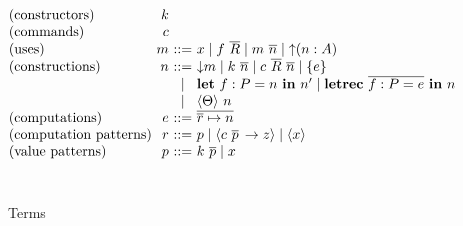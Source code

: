 \documentclass[msc,deptreport,cs]{infthesis} %
\makeatletter
\newcommand{\many}{\overline}
\newcommand\ba{\begin{array}}
\newcommand\ea{\end{array}}
\newenvironment{syntax}{\[\ba{@{}l@{~}r@{~}c@{~}l@{}}}{\ea\]\ignorespacesafterend}
\newcommand{\adapt}{\Theta}
\newcommand{\key}[1]{\mathbf{#1}} %
\newcommand{\handleSymbol}{\rightarrow}
\newcommand{\handle}[2]{{#1} \handleSymbol {#2}}
\newcommand{\thunk}[1]{\{{#1}\}}
\newcommand{\slab}[1]{(\textrm{#1})}
\newcommand{\effin}[1]{\langle {#1} \rangle}
\newcommand{\uc}{\mathord{\downarrow}}
\newcommand{\cu}{\mathord{\uparrow}}
\newcommand{\gor}{\mid}
\makeatother
\begin{document}
\begin{figure} %
\begin{syntax}
  \slab{constructors}               & k \\
  \slab{commands}                   & c \\
  \slab{uses}                 & m      &::= &
     x \gor f~\many{R} \gor m~\many{n} \gor \cu(n:A) \\
  \slab{constructions}        & n      &::= &
    \uc m \gor k~\many{n} \gor c~\many{R}~\many{n} \gor \thunk{e} \\
                              &        &\gor& \key{let}~f : P = n~\key{in}~n'
                                   \gor
                                   \key{letrec}~\many{f : P = e}~\key{in}~n \\
                              &        &\gor&  \effin{\adapt}~n \\
  \slab{computations}         & e      &::=& \many{\many{r} \mapsto n}
  \\
  \slab{computation patterns} & r      &::=& p
                                        \gor \effin{\handle{c~\many{p}\,}{z}}
                                        \gor \effin{x} \\
  \slab{value patterns}       & p      &::=& k~\many{p} \gor x        \\
\end{syntax}
\\[0.25cm]
\caption{Terms}
\label{fig:terms}
\end{figure}
\end{document}
